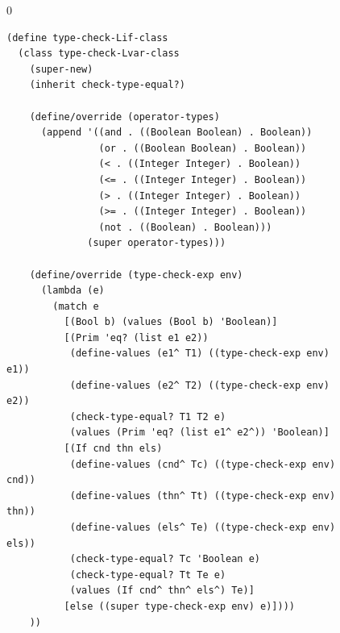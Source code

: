 \documentclass[7x10]{TimesAPriori_MIT}%
\def\racketEd{0}
\def\edition{1}
\numberwithin{theorem}{chapter}
\numberwithin{definition}{chapter}
\numberwithin{equation}{chapter}
\begin{document}
\begin{figure}[tbp]
\begin{tcolorbox}[colback=white]  
{\if\edition\racketEd    
\begin{lstlisting}[basicstyle=\ttfamily\footnotesize]
(define type-check-Lif-class
  (class type-check-Lvar-class
    (super-new)
    (inherit check-type-equal?)
    
    (define/override (operator-types)
      (append '((and . ((Boolean Boolean) . Boolean))
                (or . ((Boolean Boolean) . Boolean))
                (< . ((Integer Integer) . Boolean))
                (<= . ((Integer Integer) . Boolean))
                (> . ((Integer Integer) . Boolean))
                (>= . ((Integer Integer) . Boolean))
                (not . ((Boolean) . Boolean)))
              (super operator-types)))

    (define/override (type-check-exp env)
      (lambda (e)
        (match e
          [(Bool b) (values (Bool b) 'Boolean)]
          [(Prim 'eq? (list e1 e2))
           (define-values (e1^ T1) ((type-check-exp env) e1))
           (define-values (e2^ T2) ((type-check-exp env) e2))
           (check-type-equal? T1 T2 e)
           (values (Prim 'eq? (list e1^ e2^)) 'Boolean)]
          [(If cnd thn els)
           (define-values (cnd^ Tc) ((type-check-exp env) cnd))
           (define-values (thn^ Tt) ((type-check-exp env) thn))
           (define-values (els^ Te) ((type-check-exp env) els))
           (check-type-equal? Tc 'Boolean e)
           (check-type-equal? Tt Te e)
           (values (If cnd^ thn^ els^) Te)]
          [else ((super type-check-exp env) e)])))
    ))


\end{lstlisting}}
\end{tcolorbox}
\end{figure}
\end{document}
